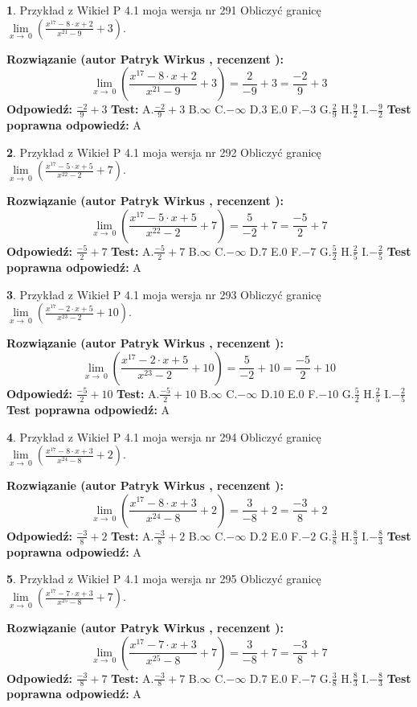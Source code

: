 \documentclass[12pt, a4paper]{article}
\theoremstyle{definition} %
\newtheorem{zad}{}
\newcommand{\zadStart}[1]{\begin{zad}#1\newline}
\newcommand{\zadStop}{\end{zad}}
\newcommand{\rozwStart}[2]{\noindent \textbf{Rozwiązanie (autor #1 , recenzent #2): }\newline}
\newcommand{\rozwStop}{\newline}
\newcommand{\odpStart}{\noindent \textbf{Odpowiedź:}\newline}
\newcommand{\odpStop}{\newline}
\newcommand{\testStart}{\noindent \textbf{Test:}\newline}
\newcommand{\testStop}{\newline}
\newcommand{\kluczStart}{\noindent \textbf{Test poprawna odpowiedź:}\newline}
\newcommand{\kluczStop}{\newline}
\begin{document}
\zadStart{Przykład z Wikieł P 4.1 moja wersja nr 291}
Obliczyć granicę $\lim\limits_{x\to\ 0}(\frac{x^{17}-8 \cdot x +2}{x^{21}-9}+3)$.
\zadStop
\rozwStart{Patryk Wirkus}{}
$$\lim\limits_{x\to\ 0}(\frac{x^{17}-8 \cdot x +2}{x^{21}-9}+3)=\frac{2}{-9}+3=\frac{-2}{9}+3$$
\rozwStop
\odpStart
$\frac{-2}{9}+3$
\odpStop
\testStart
A.$\frac{-2}{9}+3$
B.$\infty$
C.$-\infty$
D.$3$
E.$0$
F.$-3$
G.$\frac{2}{9}$
H.$\frac{9}{2}$
I.$-\frac{9}{2}$
\testStop
\kluczStart
A
\kluczStop



\zadStart{Przykład z Wikieł P 4.1 moja wersja nr 292}
Obliczyć granicę $\lim\limits_{x\to\ 0}(\frac{x^{17}-5 \cdot x +5}{x^{22}-2}+7)$.
\zadStop
\rozwStart{Patryk Wirkus}{}
$$\lim\limits_{x\to\ 0}(\frac{x^{17}-5 \cdot x +5}{x^{22}-2}+7)=\frac{5}{-2}+7=\frac{-5}{2}+7$$
\rozwStop
\odpStart
$\frac{-5}{2}+7$
\odpStop
\testStart
A.$\frac{-5}{2}+7$
B.$\infty$
C.$-\infty$
D.$7$
E.$0$
F.$-7$
G.$\frac{5}{2}$
H.$\frac{2}{5}$
I.$-\frac{2}{5}$
\testStop
\kluczStart
A
\kluczStop



\zadStart{Przykład z Wikieł P 4.1 moja wersja nr 293}
Obliczyć granicę $\lim\limits_{x\to\ 0}(\frac{x^{17}-2 \cdot x +5}{x^{23}-2}+10)$.
\zadStop
\rozwStart{Patryk Wirkus}{}
$$\lim\limits_{x\to\ 0}(\frac{x^{17}-2 \cdot x +5}{x^{23}-2}+10)=\frac{5}{-2}+10=\frac{-5}{2}+10$$
\rozwStop
\odpStart
$\frac{-5}{2}+10$
\odpStop
\testStart
A.$\frac{-5}{2}+10$
B.$\infty$
C.$-\infty$
D.$10$
E.$0$
F.$-10$
G.$\frac{5}{2}$
H.$\frac{2}{5}$
I.$-\frac{2}{5}$
\testStop
\kluczStart
A
\kluczStop



\zadStart{Przykład z Wikieł P 4.1 moja wersja nr 294}
Obliczyć granicę $\lim\limits_{x\to\ 0}(\frac{x^{17}-8 \cdot x +3}{x^{24}-8}+2)$.
\zadStop
\rozwStart{Patryk Wirkus}{}
$$\lim\limits_{x\to\ 0}(\frac{x^{17}-8 \cdot x +3}{x^{24}-8}+2)=\frac{3}{-8}+2=\frac{-3}{8}+2$$
\rozwStop
\odpStart
$\frac{-3}{8}+2$
\odpStop
\testStart
A.$\frac{-3}{8}+2$
B.$\infty$
C.$-\infty$
D.$2$
E.$0$
F.$-2$
G.$\frac{3}{8}$
H.$\frac{8}{3}$
I.$-\frac{8}{3}$
\testStop
\kluczStart
A
\kluczStop



\zadStart{Przykład z Wikieł P 4.1 moja wersja nr 295}
Obliczyć granicę $\lim\limits_{x\to\ 0}(\frac{x^{17}-7 \cdot x +3}{x^{25}-8}+7)$.
\zadStop
\rozwStart{Patryk Wirkus}{}
$$\lim\limits_{x\to\ 0}(\frac{x^{17}-7 \cdot x +3}{x^{25}-8}+7)=\frac{3}{-8}+7=\frac{-3}{8}+7$$
\rozwStop
\odpStart
$\frac{-3}{8}+7$
\odpStop
\testStart
A.$\frac{-3}{8}+7$
B.$\infty$
C.$-\infty$
D.$7$
E.$0$
F.$-7$
G.$\frac{3}{8}$
H.$\frac{8}{3}$
I.$-\frac{8}{3}$
\testStop
\kluczStart
A
\kluczStop
\end{document}

